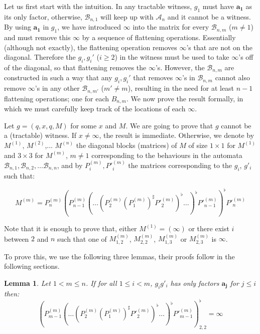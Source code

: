 \documentclass[10pt,a4paper]{amsart}
\newtheorem{lem}[lem]{Lemma}
\theoremstyle{definition}
\numberwithin{equation}{section}
\theoremstyle{remark}
\newcommand{\autA}{\mathcal{A}}
\newcommand{\autB}{\mathcal{B}}
\theoremstyle{remark}
\begin{document}
Let us first start with the intuition. In any tractable witness,  $g_1$ must have $\boldsymbol{a_1}$ as its only factor, otherwise, $\autB_{n,1}$ will keep up with $\autA_n$ and it cannot be a witness. By using $\boldsymbol{a_1}$ in $g_1$, we have introduced $\infty$ into the matrix for every $\autB_{n,m}$ ($m\ne 1$) and must remove this $\infty$ by a sequence of flattening operations. Essentially (although not exactly), the flattening operation removes $\infty$'s that are not on the diagonal. Therefore the $g_i,g_i'$ ($i\ge 2$) in the witness  must be used to take $\infty$'s off of the diagonal, so that flattening removes the $\infty$'s. However, the $\autB_{n,m}$ are constructed in such a way that any $g_i, g_i'$ that removes $\infty$'s in $\autB_{n,m}$ cannot also remove $\infty$'s in any other $\autB_{n,m'}$ ($m'\ne m$), resulting in the need for at least $n-1$ flattening operations; one for each $B_{n,m}$. We now prove the result formally, in which we must carefully keep track of the locations of each $\infty$.

Let $g = (q,x,q,M)$ for some $x$ and $M$. We are going to prove that $g$ cannot be a (tractable) witness. If $x \neq \infty$, the result is immediate. Otherwise, we denote by $M^{(1)}$, $M^{(2)}$,... $M^{(n)}$ the diagonal blocks (matrices) of $M$ of size $1\times 1$ for $M^{(1)}$ and $3\times 3$ for $M^{(m)}$, $m\neq 1$ corresponding to the behaviours in the automata $\autB_{n,1}, \autB_{n,2}, \ldots \autB_{n,n}$, and by $P^{(m)}_i,P'^{(m)}_i$ the matrices corresponding to the $g_i$, $g'_i$ such that:

$$M^{(m)} = P^{(m)}_n (P^{(m)}_{n-1} (\ldots (P^{(m)}_2 (P^{(m)}_1)^\sharp P'^{(m)}_2)^\flat \ldots)^\flat P'^{(m)}_{n-1})^\flat P'^{(m)}_n$$

Note that it is enough to prove that, either $M^{(1)} = (\infty)$ or there exist $i$ between $2$ and $n$ such that one of $M^{(m)}_{1,2}$, $M^{(m)}_{2,2}$, $M^{(m)}_{1,3}$ or $M^{(m)}_{2,3}$ is $\infty$.



To prove this, we use the following three lemmas, their proofs follow in the following sections.

\begin{lem}
\label{lemma:one}
Let $1< m\leq n$. If for all $1\leq i < m$, $g_ig'_i$ has only factors $\boldsymbol{a_j}$ for $j\leq i$ then:
$$(P^{(m)}_{m-1} (\ldots (P^{(m)}_2 (P^{(m)}_1)^\sharp P'^{(m)}_2)^\flat \ldots)^\flat P'^{(m)}_{m-1})^\flat_{2,2} = \infty$$
\end{lem}
\end{document}
